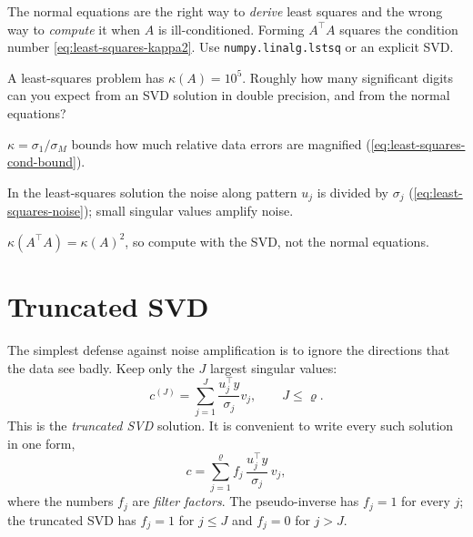 \begin{pitfall}
The normal equations are the right way to \emph{derive} least squares and the wrong way to \emph{compute} it when $A$ is ill-conditioned. Forming $A^\top A$ squares the condition number \cref{eq:least-squares-kappa2}. Use \texttt{numpy.linalg.lstsq} or an explicit SVD.
\end{pitfall}

\begin{checkpoint}
A least-squares problem has $\kappa(A)=10^5$. Roughly how many significant digits can you expect from an SVD solution in double precision, and from the normal equations?
\end{checkpoint}

\begin{keyideas}
\item $\kappa = \sigma_1/\sigma_M$ bounds how much relative data errors are magnified (\cref{eq:least-squares-cond-bound}).
\item In the least-squares solution the noise along pattern $u_j$ is divided by $\sigma_j$ (\cref{eq:least-squares-noise}); small singular values amplify noise.
\item $\kappa(A^\top A) = \kappa(A)^2$, so compute with the SVD, not the normal equations.
\end{keyideas}

\section{Truncated SVD}\label{sec:least-squares-tsvd}

The simplest defense against noise amplification is to ignore the directions that the data see badly. Keep only the $J$ largest singular values:
\begin{equation}
c^{(J)} = \sum_{j=1}^{J}\frac{u_j^\top y}{\sigma_j}v_j ,\qquad J\le\varrho .
\label{eq:least-squares-tsvd}
\end{equation}
This is the \emph{truncated SVD} solution. It is convenient to write every such solution in one form,
\begin{equation}
c = \sum_{j=1}^\varrho f_j\,\frac{u_j^\top y}{\sigma_j}\,v_j ,
\label{eq:least-squares-filter-form}
\end{equation}
where the numbers $f_j$ are \emph{filter factors}. The pseudo-inverse has $f_j = 1$ for every $j$; the truncated SVD has $f_j = 1$ for $j\le J$ and $f_j = 0$ for $j>J$.

